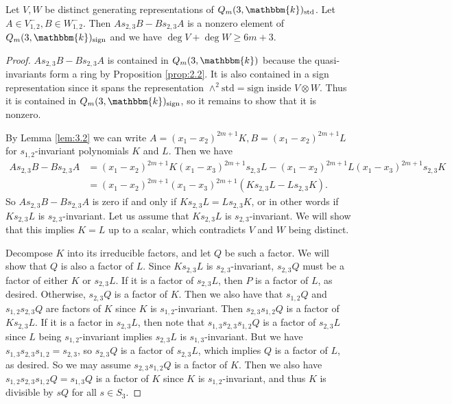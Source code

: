 \documentclass[11pt]{article}
\numberwithin{equation}{section}
\theoremstyle{definition}
\numberwithin{equation}{section}
\renewcommand{\k}{\mathbbm{k}}
\newcommand{\sgn}{\mathrm{sign}}
\newcommand{\std}{\mathrm{std}}
\begin{document}
\begin{lemma}\label{lem:3.4}
    Let $V,W$ be distinct generating representations of $Q_m(3,\k)_\std$. Let $A\in V_{1,2}^-,B\in W_{1,2}^-$. Then $As_{2,3}B-Bs_{2,3}A$ is a nonzero element of $Q_m(3,\k)_\sgn$ and we have $\deg V+\deg W\geq 6m+3$.
\end{lemma}
\begin{proof}
    $As_{2,3}B-Bs_{2,3}A$ is contained in $Q_m(3,\k)$ because the quasi-invariants form a ring by Proposition \ref{prop:2.2}. It is also contained in a sign representation since it spans the representation $\wedge^2\std=\sgn$ inside $V\otimes W$. Thus it is contained in $Q_m(3,\k)_\sgn$, so it remains to show that it is nonzero.
    
    By Lemma \ref{lem:3.2} we can write $A=(x_1-x_2)^{2m+1}K,B=(x_1-x_2)^{2m+1}L$ for $s_{1,2}$-invariant polynomials $K$ and $L$. Then we have
    \begin{align*}
        As_{2,3}B-Bs_{2,3}A&=(x_1-x_2)^{2m+1}K(x_1-x_3)^{2m+1}s_{2,3}L-(x_1-x_2)^{2m+1}L(x_1-x_3)^{2m+1}s_{2,3}K\\
        &=(x_1-x_2)^{2m+1}(x_1-x_3)^{2m+1}(Ks_{2,3}L-Ls_{2,3}K).
    \end{align*}
    So $As_{2,3}B-Bs_{2,3}A$ is zero if and only if $Ks_{2,3}L=Ls_{2,3}K$, or in other words if $Ks_{2,3}L$ is $s_{2,3}$-invariant. Let us assume that $Ks_{2,3}L$ is $s_{2,3}$-invariant. We will show that this implies $K=L$ up to a scalar, which contradicts $V$ and $W$ being distinct.
    
    Decompose $K$ into its irreducible factors, and let $Q$ be such a factor. We will show that $Q$ is also a factor of $L$. Since $Ks_{2,3}L$ is $s_{2,3}$-invariant, $s_{2,3}Q$ must be a factor of either $K$ or $s_{2,3}L$. If it is a factor of $s_{2,3}L$, then $P$ is a factor of $L$, as desired. Otherwise, $s_{2,3}Q$ is a factor of $K$. Then we also have that $s_{1,2}Q$ and $s_{1,2}s_{2,3}Q$ are factors of $K$ since $K$ is $s_{1,2}$-invariant. Then $s_{2,3}s_{1,2}Q$ is a factor of $Ks_{2,3}L$. If it is a factor in $s_{2,3}L$, then note that $s_{1,3}s_{2,3}s_{1,2}Q$ is a factor of $s_{2,3}L$ since $L$ being $s_{1,2}$-invariant implies $s_{2,3}L$ is $s_{1,3}$-invariant. But we have $s_{1,3}s_{2,3}s_{1,2}=s_{2,3}$, so $s_{2,3}Q$ is a factor of $s_{2,3}L$, which implies $Q$ is a factor of $L$, as desired. So we may assume $s_{2,3}s_{1,2}Q$ is a factor of $K$. Then we also have $s_{1,2}s_{2,3}s_{1,2}Q=s_{1,3}Q$ is a factor of $K$ since $K$ is $s_{1,2}$-invariant, and thus $K$ is divisible by $sQ$ for all $s\in S_3$. 
    

\end{proof}
\end{document}
